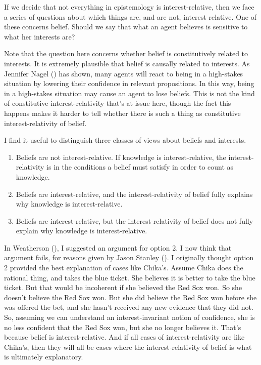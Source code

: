 \documentclass[
  10pt,
  letterpaper,
  DIV=11,
  numbers=noendperiod,
  twoside]{scrartcl}
\providecommand{\tightlist}{%
  \setlength{\itemsep}{0pt}\setlength{\parskip}{0pt}}\usepackage{longtable,booktabs,array}
\begin{document}
If we decide that not everything in epistemology is interest-relative,
then we face a series of questions about which things are, and are not,
interest relative. One of these concerns belief. Should we say that what
an agent believes is sensitive to what her interests are?

Note that the question here concerns whether belief is constitutively
related to interests. It is extremely plausible that belief is causally
related to interests. As Jennifer Nagel ()
has shown, many agents will react to being in a high-stakes situation by
lowering their confidence in relevant propositions. In this way, being
in a high-stakes situation may cause an agent to lose beliefs. This is
not the kind of constitutive interest-relativity that's at issue here,
though the fact this happens makes it harder to tell whether there is
such a thing as constitutive interest-relativity of belief.

I find it useful to distinguish three classes of views about beliefs and
interests.

\begin{enumerate}
\def\labelenumi{\arabic{enumi}.}
\tightlist
\item
  Beliefs are not interest-relative. If knowledge is interest-relative,
  the interest-relativity is in the conditions a belief must satisfy in
  order to count as knowledge.
\item
  Beliefs are interest-relative, and the interest-relativity of belief
  fully explains why knowledge is interest-relative.
\item
  Beliefs are interest-relative, but the interest-relativity of belief
  does not fully explain why knowledge is interest-relative.
\end{enumerate}

In Weatherson (), I suggested an
argument for option 2. I now think that argument fails, for reasons
given by Jason Stanley (). I originally
thought option 2 provided the best explanation of cases like Chika's.
Assume Chika does the rational thing, and takes the blue ticket. She
believes it is better to take the blue ticket. But that would be
incoherent if she believed the Red Sox won. So she doesn't believe the
Red Sox won. But she did believe the Red Sox won before she was offered
the bet, and she hasn't received any new evidence that they did not. So,
assuming we can understand an interest-invariant notion of confidence,
she is no less confident that the Red Sox won, but she no longer
believes it. That's because belief is interest-relative. And if all
cases of interest-relativity are like Chika's, then they will all be
cases where the interest-relativity of belief is what is ultimately
explanatory.
\end{document}
